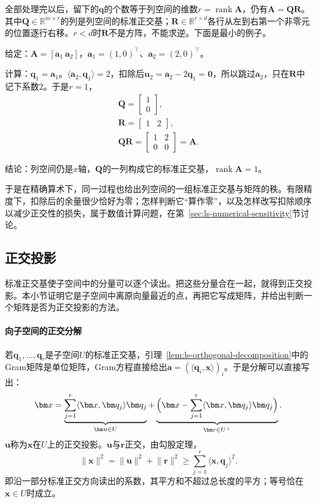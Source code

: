 全部处理完以后，留下的$\bm q$的个数等于列空间的维数$r=\operatorname{rank}\bm A$，仍有$\bm A=\bm Q\bm R$。其中$\bm Q\in\mathbb R^{m\times r}$的列是列空间的标准正交基；$\bm R\in\mathbb R^{r\times d}$各行从左到右第一个非零元的位置逐行右移。$r<d$时$\bm R$不是方阵，不能求逆。下面是最小的例子。
\begin{example}[列相关时跳过零余量]
\label{ex:ls-qr-dependent-columns}
给定：$\bm A=[\bm a_1\ \bm a_2]$，$\bm a_1=(1,0)^\top$、$\bm a_2=(2,0)^\top$。

计算：$\bm q_1=\bm a_1$。$\langle\bm a_2,\bm q_1\rangle=2$，扣除后$\bm u_2=\bm a_2-2\bm q_1=\bm0$，所以跳过$\bm a_2$，只在$\bm R$中记下系数$2$。于是$r=1$，
\[
\begin{gathered}
\bm Q=\begin{bmatrix}1\\0\end{bmatrix},\\
\bm R=\begin{bmatrix}1&2\end{bmatrix},\\
\bm Q\bm R=\begin{bmatrix}1&2\\0&0\end{bmatrix}=\bm A .
\end{gathered}
\]

结论：列空间仍是$x$轴，$\bm Q$的一列构成它的标准正交基，$\operatorname{rank}\bm A=1$。
\end{example}
于是在精确算术下，同一过程也给出列空间的一组标准正交基与矩阵的秩。有限精度下，扣除后的余量很少恰好为零；怎样判断它“算作零”，以及怎样改写扣除顺序以减少正交性的损失，属于数值计算问题，在第~\ref{sec:ls-numerical-sensitivity}节讨论。

\subsection{正交投影}
\label{sec:ls-orthogonal-projection}

标准正交基使子空间中的分量可以逐个读出。把这些分量合在一起，就得到正交投影。本小节证明它是子空间中离原向量最近的点，再把它写成矩阵，并给出判断一个矩阵是否为正交投影的方法。

\paragraph{向子空间的正交分解}
若$\bm q_1,\ldots,\bm q_r$是子空间$U$的标准正交基，引理~\ref{lem:ls-orthogonal-decomposition}中的Gram矩阵是单位矩阵，Gram方程直接给出$\bm a=(\langle\bm q_i,\bm x\rangle)_i$。于是分解可以直接写出：
\begin{equation}
 \bm x=\underbrace{\sum_{j=1}^r\langle\bm x,\bm q_j\rangle\bm q_j}_{\bm u\in U}+\underbrace{\Bigl(\bm x-\sum_{j=1}^r\langle\bm x,\bm q_j\rangle\bm q_j\Bigr)}_{\bm r\in U^\perp}.
 \label{eq:ls-orthonormal-projection}
\end{equation}
$\bm u$称为$\bm x$在$U$上的正交投影。$\bm u$与$\bm r$正交，由勾股定理，
\[
 \lVert\bm x\rVert^2=\lVert\bm u\rVert^2+\lVert\bm r\rVert^2\geq\sum_{j=1}^r\langle\bm x,\bm q_j\rangle^2.
\]
即沿一部分标准正交方向读出的系数，其平方和不超过总长度的平方；等号恰在$\bm x\in U$时成立。


